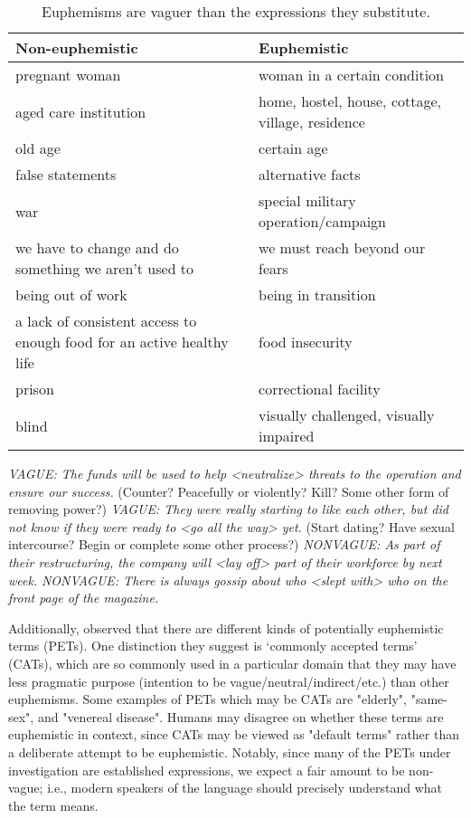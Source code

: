 \documentclass[11pt]{article}
\begin{document}
\begin{table*}[htp]
\begin{small}
    \centering
    \begin{tabular}{l|l}
        Non-euphemistic & Euphemistic \\
        \hline 
        pregnant woman & woman in a certain condition \\
        aged care institution & home, hostel, house, cottage, village, residence \\
        old age & certain age \\
        false statements & alternative facts \\
        war & special military operation/campaign \\
        we have to change and do something we aren't used to & we must reach beyond our fears \\
        being out of work & being in transition \\
        a lack of consistent access to enough food for an active healthy life & food insecurity \\
        prison & correctional facility \\
        blind & visually challenged, visually impaired \\
        \hline
    \end{tabular}
    \caption{Euphemisms are vaguer than the expressions they substitute.}
    \label{tbl:vagueness}
    \end{small}
\end{table*}

\bigskip
\noindent
\emph{VAGUE: The funds will be used to help <neutralize> threats to the operation and ensure our success.} (Counter? Peacefully or violently? Kill? Some other form of removing power?)
\newline
\emph{VAGUE: They were really starting to like each other, but did not know if they were ready to <go all the way> yet.} (Start dating? Have sexual intercourse? Begin or complete some other process?)
\newline
\emph{NONVAGUE: As part of their restructuring, the company will <lay off> part of their workforce by next week.}
\newline
\emph{NONVAGUE: There is always gossip about who <slept with> who on the front page of the magazine.}
\newline

Additionally, \citet{gavidia-etal-2022-cats,lee2022searching} observed that there are different kinds of potentially euphemistic terms (PETs).  One distinction they suggest is `commonly accepted terms' (CATs),  which are so commonly used in a particular domain that they may have less pragmatic purpose (intention to be vague/neutral/indirect/etc.) than other euphemisms. Some examples of PETs which may be CATs are "elderly", "same-sex", and "venereal disease". Humans may disagree on whether these terms are euphemistic in context, since CATs may be viewed as "default terms" rather than a deliberate attempt to be euphemistic. Notably, since many of the PETs under investigation are established expressions, we expect a fair amount to be non-vague; i.e., modern speakers of the language should precisely understand what the term means.
\end{document}
